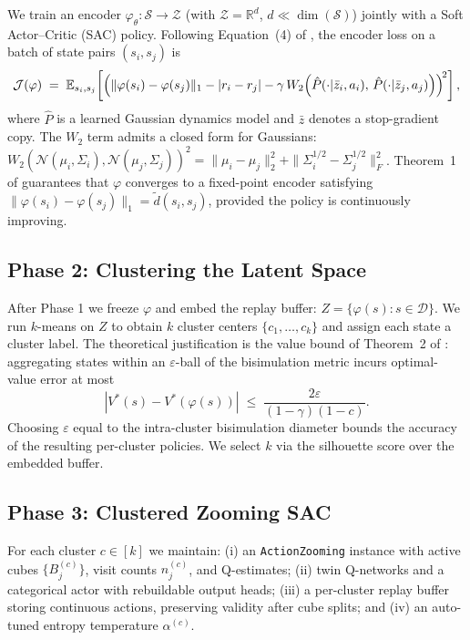\documentclass{article}
\begin{document}
We train an encoder $\varphi_\theta : \mathcal{S} \to \mathcal{Z}$ (with
$\mathcal{Z} = \mathbb{R}^d$, $d \ll \dim(\mathcal{S})$) jointly with a Soft
Actor--Critic (SAC) policy. Following Equation~(4) of \citet{zhang2021}, the encoder
loss on a batch of state pairs $(s_i, s_j)$ is
\[
  \mathcal{J}(\varphi) \;=\;
    \mathbb{E}_{s_i, s_j}\!\left[
      \Bigl(
        \|\varphi(s_i) - \varphi(s_j)\|_1
        - |r_i - r_j|
        - \gamma\,W_2\!\left(\hat{P}(\cdot|\bar{z}_i, a_i),\,
                            \hat{P}(\cdot|\bar{z}_j, a_j)\right)
      \Bigr)^{\!2}
    \right],
\]
where $\hat{P}$ is a learned Gaussian dynamics model and $\bar{z}$ denotes a
stop-gradient copy. The $W_2$ term admits a closed form for Gaussians:
$W_2(\mathcal{N}(\mu_i,\Sigma_i), \mathcal{N}(\mu_j,\Sigma_j))^2 =
\|\mu_i-\mu_j\|_2^2 + \|\Sigma_i^{1/2}-\Sigma_j^{1/2}\|_F^2$.
Theorem~1 of \citet{zhang2021} guarantees that $\varphi$ converges to a fixed-point
encoder satisfying $\|\varphi(s_i)-\varphi(s_j)\|_1 = \tilde{d}(s_i, s_j)$, provided
the policy is continuously improving.

\subsection{Phase 2: Clustering the Latent Space}

After Phase 1 we freeze $\varphi$ and embed the replay buffer:
$Z = \{\varphi(s) : s \in \mathcal{D}\}$.
We run $k$-means on $Z$ to obtain $k$ cluster centers $\{c_1,\ldots,c_k\}$ and
assign each state a cluster label. The theoretical justification is the value bound
of Theorem~2 of \citet{zhang2021}: aggregating states within an $\varepsilon$-ball
of the bisimulation metric incurs optimal-value error at most
\begin{equation}
  |V^*(s) - V^*(\varphi(s))| \;\le\; \frac{2\varepsilon}{(1-\gamma)(1-c)}.
  \label{eq:value_bound}
\end{equation}
Choosing $\varepsilon$ equal to the intra-cluster bisimulation diameter bounds the
accuracy of the resulting per-cluster policies. We select $k$ via the silhouette score
over the embedded buffer.

\subsection{Phase 3: Clustered Zooming SAC}

For each cluster $c \in [k]$ we maintain: (i) an \texttt{ActionZooming} instance with
active cubes $\{B_j^{(c)}\}$, visit counts $n_j^{(c)}$, and Q-estimates; (ii) twin
Q-networks and a categorical actor with rebuildable output heads; (iii) a per-cluster
replay buffer storing continuous actions, preserving validity after cube splits; and
(iv) an auto-tuned entropy temperature $\alpha^{(c)}$.
\end{document}
